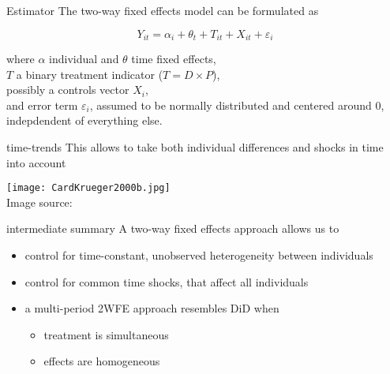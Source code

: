 \documentclass[aspectratio=169]{beamer}
\begin{document}
		\begin{frame}{Estimator}
			The two-way fixed effects model can be formulated as
			\\ \vspace*{.25cm}

			\begin{equation}
				Y_{it} = \alpha_i + \theta_t + T_{it} + X_{it} + \varepsilon_i
			\end{equation}

			\vspace*{.25cm}
			where $\alpha$ individual and $\theta$ time fixed effects, \\
			$T$ a binary treatment indicator ($T=D \times P$), \\ possibly a controls vector $X_i$, \\
			and error term $\varepsilon_i$, assumed to be normally distributed and centered around $0$, indepdendent of everything else.
		\end{frame}

		\begin{frame}{time-trends}
			This allows to take both individual differences and shocks in time into account
			\begin{center}
				\texttt{[image: CardKrueger2000b.jpg]}
				\\ \tiny{ Image source: \cite{Card2000}}
			\end{center}
		\end{frame}

		\begin{frame}{intermediate summary}
			A two-way fixed effects approach allows us to \\ \vspace*{.5cm}
			\begin{itemize}
				\item control for time-constant, unobserved heterogeneity between individuals
				\item control for common time shocks, that affect all individuals
				\item a multi-period 2WFE approach resembles DiD when
				\begin{itemize}
					\item treatment is simultaneous
					\item effects are homogeneous
				\end{itemize}
			\end{itemize}
		\end{frame}

\end{document}
